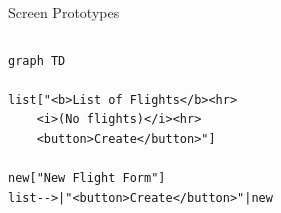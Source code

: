 \documentclass[aspectratio=43,handout,bigger]{beamer}
\begin{document}
\begin{frame}[fragile]{Screen Prototypes}
  \begin{columns}
    \begin{column}{.5\textwidth}
\begin{verbatim}
graph TD

list["<b>List of Flights</b><hr>
    <i>(No flights)</i><hr>
    <button>Create</button>"]

new["New Flight Form"]
list-->|"<button>Create</button>"|new
\end{verbatim}
  \end{column}
  \begin{column}{.5\textwidth}
  \end{column}
  \end{columns}
\end{frame}

\end{document}
